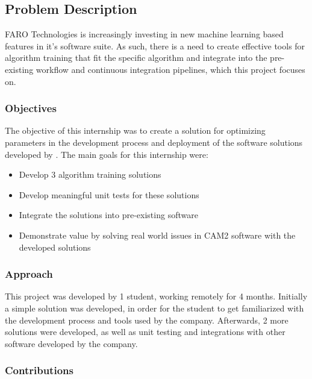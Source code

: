 
\subsection{Problem Description}

FARO Technologies\textsuperscript{\textregistered} is increasingly investing in new machine learning based features in it's software suite. As such, there is a need to create effective tools for algorithm training that fit the specific algorithm and integrate into the pre-existing workflow and continuous integration pipelines, which this project focuses on.

\subsubsection{Objectives}

The objective of this internship was to create a solution for optimizing parameters in the development process and deployment of the software solutions developed by \faro. The main goals for this internship were:

\begin{itemize}
	\item Develop 3 algorithm training solutions
	\item Develop meaningful unit tests for these solutions
	\item Integrate the solutions into pre-existing software
	\item Demonstrate value by solving real world issues in CAM2\textsuperscript{\textregistered} software with the developed solutions
\end{itemize}

\subsubsection{Approach}

This project was developed by 1 student, working remotely for 4 months. Initially a simple solution was developed, in order for the student to get familiarized with the development process and tools used by the company. Afterwards, 2 more solutions were developed, as well as unit testing and integrations with other software developed by the company.

\subsubsection{Contributions}

